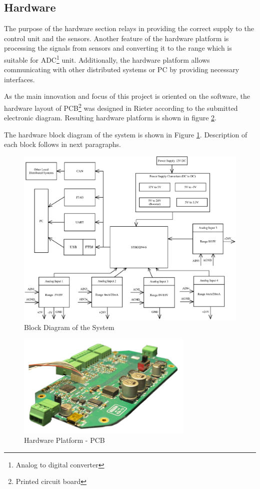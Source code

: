 \documentclass[twoside]{ctuthesis}
\theoremstyle{plain}
\theoremstyle{definition}
\theoremstyle{note}
\begin{document}
\subsection{Hardware}
The purpose of the hardware section relays in providing the correct supply to the control unit and the sensors. Another feature of the hardware platform is processing the signals from sensors and converting it to the range which is suitable for ADC\footnote{Analog to digital converter} unit. Additionally, the hardware platform allows communicating with other distributed systems or PC by providing necessary interfaces. 

As the main innovation and focus of this project is oriented on the software, the hardware layout of PCB\footnote{Printed circuit board} was designed in Rieter according to the submitted electronic diagram. Resulting hardware platform is shown in figure \ref{fig:cvBox_dps}.

The hardware block diagram of the system is shown in Figure \ref{fig:blockDiagram_HW}. Description of each block follows in next paragraphs.
\begin{figure}[h]
	\centering
	\includegraphics[width=1.0\textwidth]{blockSchematic5.eps}
	\caption{Block Diagram of the System}
	\label{fig:blockDiagram_HW}
\end{figure}

\begin{figure}[h]
	\centering
	\includegraphics[width=0.75\textwidth]{cvBox.jpg}
	\caption{Hardware Platform - PCB}
	\label{fig:cvBox_dps}
\end{figure}
\end{document}
